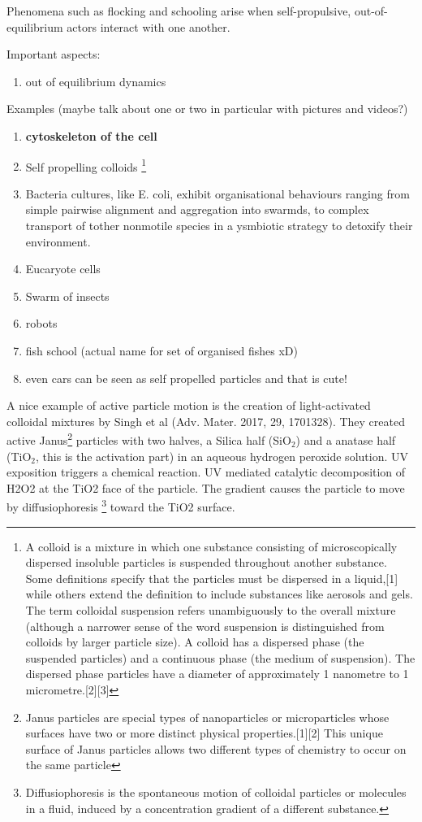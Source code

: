 \documentclass[a4paper]{article}
\begin{document}
Phenomena such as flocking and schooling arise when self-propulsive, out-of-equilibrium actors interact with one another. 

Important aspects:

\begin{enumerate}
	\item out of equilibrium dynamics
\end{enumerate}

Examples (maybe talk about one or two in particular with pictures and videos?)

\begin{enumerate}
	\item \textbf{cytoskeleton of the cell}
	\item Self propelling colloids \footnote{A colloid is a mixture in which one substance consisting of microscopically dispersed insoluble particles is suspended throughout another substance. Some definitions specify that the particles must be dispersed in a liquid,[1] while others extend the definition to include substances like aerosols and gels. The term colloidal suspension refers unambiguously to the overall mixture (although a narrower sense of the word suspension is distinguished from colloids by larger particle size). A colloid has a dispersed phase (the suspended particles) and a continuous phase (the medium of suspension). The dispersed phase particles have a diameter of approximately 1 nanometre to 1 micrometre.[2][3]}
	\item Bacteria cultures, like E. coli, exhibit organisational behaviours ranging from simple pairwise alignment and aggregation into swarmds, to complex transport of tother nonmotile species in a ysmbiotic strategy to detoxify their environment.
	\item Eucaryote cells
	\item Swarm of insects 
	\item robots
	\item fish school (actual name for set of organised fishes xD)
	\item even cars can be seen as self propelled particles and that is cute! 
\end{enumerate}

A nice example of active particle motion is the creation of light-activated colloidal mixtures by Singh et al (Adv. Mater. 2017, 29, 1701328). They created active Janus\footnote{Janus particles are special types of nanoparticles or microparticles whose surfaces have two or more distinct physical properties.[1][2] This unique surface of Janus particles allows two different types of chemistry to occur on the same particle} particles with two halves, a Silica half (SiO$_2$) and a anatase half (TiO$_2$, this is the activation part) in an aqueous hydrogen peroxide solution. UV exposition triggers a chemical reaction. UV mediated catalytic decomposition of H2O2 at the TiO2 face of the particle. The gradient causes the particle to move by diffusiophoresis \footnote{Diffusiophoresis is the spontaneous motion of colloidal particles or molecules in a fluid, induced by a concentration gradient of a different substance.} toward the TiO2 surface.
\end{document}

